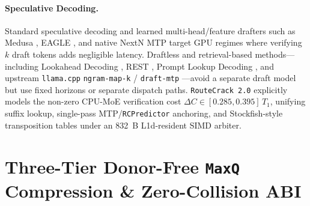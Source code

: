 \documentclass[10pt,twocolumn]{article}
\begin{document}
\paragraph{Speculative Decoding.}
Standard speculative decoding \cite{leviathan2023fast} and learned multi-head/feature drafters such as Medusa \cite{cai2024medusa}, EAGLE \cite{li2024eagle}, and native NextN MTP \cite{gloeckle2024mtp} target GPU regimes where verifying $k$ draft tokens adds negligible latency. Draftless and retrieval-based methods---including Lookahead Decoding \cite{fu2024lookahead}, REST \cite{he2024rest}, Prompt Lookup Decoding \cite{saxena2023promptlookup}, and upstream \texttt{llama.cpp} \texttt{ngram-map-k} / \texttt{draft-mtp} \cite{llamacpp}---avoid a separate draft model but use fixed horizons or separate dispatch paths. \texttt{RouteCrack 2.0} explicitly models the non-zero CPU-MoE verification cost $\Delta C \in [0.285, 0.395]\,T_1$, unifying suffix lookup, single-pass MTP/\texttt{RCPredictor} anchoring, and Stockfish-style transposition tables \cite{stockfish} under an 832~B L1d-resident SIMD arbiter.

\section{Three-Tier Donor-Free \texttt{MaxQ} Compression \& Zero-Collision ABI}
\label{sec:quant}
\end{document}

